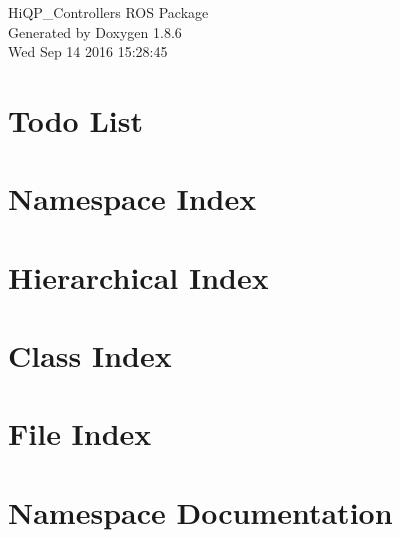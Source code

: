 \documentclass[twoside]{book}
\newcommand{\clearemptydoublepage}{%
  \newpage{\pagestyle{empty}\cleardoublepage}%
}
\begin{document}
\hypersetup{pageanchor=false}
\begin{titlepage}
\vspace*{7cm}
\begin{center}%
{\Large Hi\-Q\-P\-\_\-\-Controllers R\-O\-S Package }\\
\vspace*{1cm}
{\large Generated by Doxygen 1.8.6}\\
\vspace*{0.5cm}
{\small Wed Sep 14 2016 15:28:45}\\
\end{center}
\end{titlepage}
\clearemptydoublepage
\tableofcontents
\clearemptydoublepage
{}
\hypersetup{pageanchor=true}

\chapter{Todo List}
\label{todo}
\hypertarget{todo}{}

\chapter{Namespace Index}

\chapter{Hierarchical Index}

\chapter{Class Index}

\chapter{File Index}

\chapter{Namespace Documentation}

\end{document}
